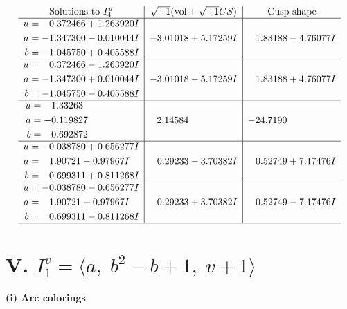 \documentclass[1p]{elsarticle_modified}
\theoremstyle{definition}
\newcommand{\I}{\sqrt{-1}}
\begin{document}
$$\begin{array}{c|c|c}  
\text{Solutions to }I^u_{4}& \I (\text{vol} + \sqrt{-1}CS) & \text{Cusp shape}\\
 \hline 
\begin{aligned}
u &= \phantom{-}0.372466 + 1.263920 I \\
a &= -1.347300 - 0.010044 I \\
b &= -1.045750 + 0.405588 I\end{aligned}
 & -3.01018 + 5.17259 I & \phantom{-}1.83188 - 4.76077 I \\ \hline\begin{aligned}
u &= \phantom{-}0.372466 - 1.263920 I \\
a &= -1.347300 + 0.010044 I \\
b &= -1.045750 - 0.405588 I\end{aligned}
 & -3.01018 - 5.17259 I & \phantom{-}1.83188 + 4.76077 I \\ \hline\begin{aligned}
u &= \phantom{-}1.33263\phantom{ +0.000000I} \\
a &= -0.119827\phantom{ +0.000000I} \\
b &= \phantom{-}0.692872\phantom{ +0.000000I}\end{aligned}
 & \phantom{-}2.14584\phantom{ +0.000000I} & -24.7190\phantom{ +0.000000I} \\ \hline\begin{aligned}
u &= -0.038780 + 0.656277 I \\
a &= \phantom{-}1.90721 - 0.97967 I \\
b &= \phantom{-}0.699311 + 0.811268 I\end{aligned}
 & \phantom{-}0.29233 - 3.70382 I & \phantom{-}0.52749 + 7.17476 I \\ \hline\begin{aligned}
u &= -0.038780 - 0.656277 I \\
a &= \phantom{-}1.90721 + 0.97967 I \\
b &= \phantom{-}0.699311 - 0.811268 I\end{aligned}
 & \phantom{-}0.29233 + 3.70382 I & \phantom{-}0.52749 - 7.17476 I\\
 \hline 
 \end{array}$$\newpage\newpage\renewcommand{\arraystretch}{1}
\centering \section*{V. $I^v_{1}= \langle a,\;b^2- b+1,\;v+1 \rangle$}
\flushleft \textbf{(i) Arc colorings}\\
\end{document}
